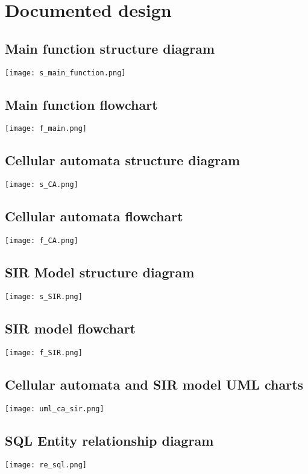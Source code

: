 \documentclass[11pt, a4paper]{article}
\begin{document}
\newpage



\newpage
\section{Documented design}


\subsection{Main function structure diagram}
\texttt{[image: s\_main\_function.png]}
\subsection{Main function flowchart}
\texttt{[image: f\_main.png]}
\newpage
\subsection{Cellular automata structure diagram}
\texttt{[image: s\_CA.png]}
\subsection{Cellular automata flowchart}
\texttt{[image: f\_CA.png]}
\newpage
\subsection{SIR Model structure diagram}
\texttt{[image: s\_SIR.png]}
\subsection{SIR model flowchart}
\texttt{[image: f\_SIR.png]}
\newpage
\subsection{Cellular automata and SIR model UML charts}
\texttt{[image: uml\_ca\_sir.png]}
\subsection{SQL Entity relationship diagram}
\texttt{[image: re\_sql.png]}
\end{document}
